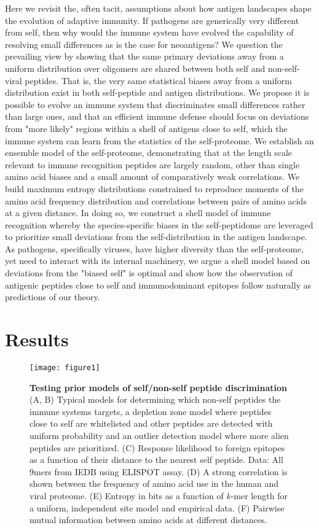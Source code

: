 \documentclass[superscriptaddress,twocolumn,pre]{revtex4}
\newcommand{\<}{\langle}
\renewcommand{\>}{\rangle}
\begin{document}
Here we revisit the, often tacit, assumptions about how antigen landscapes shape the evolution of adaptive immunity. If pathogens are generically very different from self, then why would the immune system have evolved the capability of resolving small differences as is the case for neoantigens? We question the prevailing view by showing that the same primary deviations away from a uniform distribution over oligomers are shared between both self and non-self-viral peptides. That is, the very same statistical biases away from a uniform distribution exist in both self-peptide and antigen distributions. We propose it is possible to evolve an immune system that discriminates small differences rather than large ones, and that an efficient immune defense should focus on deviations from "more likely" regions within a shell of antigens close to self, which the immune system can learn from the statistics of the self-proteome. We establish an ensemble model of the self-proteome, demonstrating that at the length scale relevant to immune recognition peptides are largely random, other than single amino acid biases and a small amount of comparatively weak correlations. We build maximum entropy distributions constrained to reproduce moments of the amino acid frequency distribution and correlations between pairs of amino acids at a given distance. In doing so, we construct a shell model of immune recognition whereby the species-specific biases in the self-peptidome are leveraged to prioritize small deviations from the self-distribution in the antigen landscape. As pathogens, specifically viruses, have higher diversity than the self-proteome, yet need to interact with its internal machinery, we argue a shell model based on deviations from the "biased self" is optimal and show how the observation of antigenic peptides close to self and immunodominant epitopes follow naturally as predictions of our theory. 


\section{Results}


\begin{figure*}
     \texttt{[image: figure1]}
     \caption{
         {\bf Testing prior models of self/non-self peptide discrimination}
         (A, B) Typical models for determining which non-self peptides the immune systems targets, a depletion zone model where peptides close to self are whitelisted and other peptides are detected with uniform probability and an outlier detection model where more alien peptides are prioritized.
         (C) Response likelihood to foreign epitopes as a function of their distance to the nearest self peptide. Data: All 9mers from IEDB using ELISPOT assay.
         (D) A strong correlation is shown between the frequency of amino acid use in the human and viral proteome.
         (E) Entropy in bits as a function of $k$-mer length for a uniform, independent site model and empirical data.
         (F) Pairwise mutual information between amino acids at different distances. 
     \label{figure1}
     }
\end{figure*}
\end{document}
